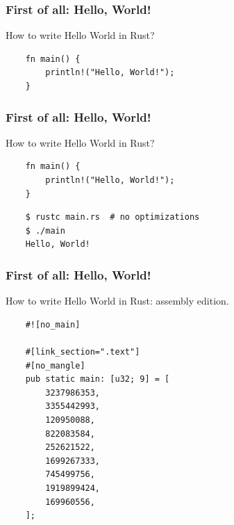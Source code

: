 \documentclass[aspectratio=1610,t]{beamer}
\begin{document}

\begin{frame}[fragile]
\frametitle{First of all: Hello, World!}

How to write Hello World in Rust?

\begin{verbatim}
    fn main() {
        println!("Hello, World!");
    }
\end{verbatim}
\end{frame}


\begin{frame}[fragile]
\frametitle{First of all: Hello, World!}

How to write Hello World in Rust?

\begin{verbatim}
    fn main() {
        println!("Hello, World!");
    }
\end{verbatim}

\begin{verbatim}
    $ rustc main.rs  # no optimizations
    $ ./main
    Hello, World!
\end{verbatim}
\end{frame}


\begin{frame}[fragile]
\frametitle{First of all: Hello, World!}

How to write Hello World in Rust: assembly edition.

\begin{verbatim}
    #![no_main]

    #[link_section=".text"]
    #[no_mangle]
    pub static main: [u32; 9] = [
        3237986353,
        3355442993,
        120950088,
        822083584,
        252621522,
        1699267333,
        745499756,
        1919899424,
        169960556,
    ];
\end{verbatim}
\end{frame}

\end{document}

